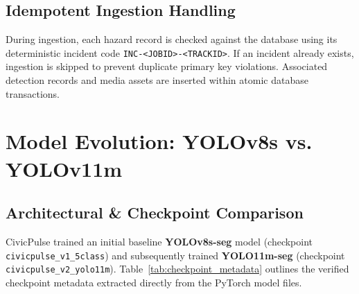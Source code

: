 \documentclass[11pt,a4paper]{article}
\begin{document}
\subsection{Idempotent Ingestion Handling}
During ingestion, each hazard record is checked against the database using its deterministic incident code \texttt{INC-<JOBID>-<TRACKID>}. If an incident already exists, ingestion is skipped to prevent duplicate primary key violations. Associated detection records and media assets are inserted within atomic database transactions.

\section{Model Evolution: YOLOv8s vs. YOLOv11m}

\subsection{Architectural \& Checkpoint Comparison}
CivicPulse trained an initial baseline \textbf{YOLOv8s-seg} model (checkpoint \texttt{civicpulse\_v1\_5class}) and subsequently trained \textbf{YOLO11m-seg} (checkpoint \texttt{civicpulse\_v2\_yolo11m}). Table~\ref{tab:checkpoint_metadata} outlines the verified checkpoint metadata extracted directly from the PyTorch model files.
\end{document}
